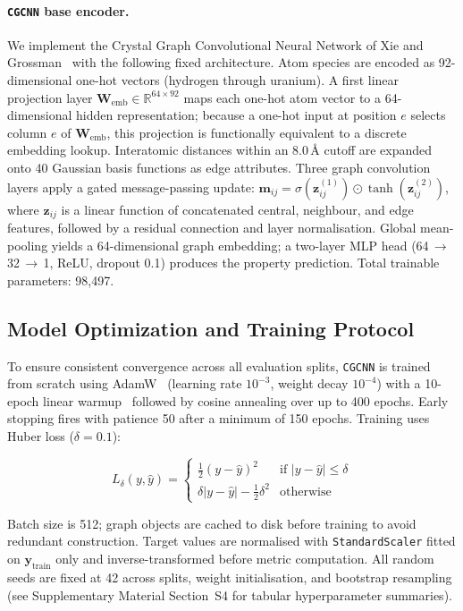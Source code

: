 \documentclass[final,5p,twocolumn,10pt]{elsarticle}
\newcommand{\cgcnn}{\texttt{CGCNN}}
\begin{document}
\paragraph{\cgcnn{} base encoder.}
We implement the Crystal Graph Convolutional Neural Network
of Xie and Grossman~\cite{xie2018crystal} with the following fixed
architecture. Atom species are encoded as 92-dimensional one-hot vectors
(hydrogen through uranium). A first linear projection layer
$\bm{W}_{\text{emb}} \in \mathbb{R}^{64 \times 92}$ maps each one-hot
atom vector to a 64-dimensional hidden representation; because a one-hot
input at position $e$ selects column $e$ of $\bm{W}_{\text{emb}}$, this
projection is functionally equivalent to a discrete embedding lookup.
Interatomic distances within an 8.0\,\AA{} cutoff are expanded onto 40
Gaussian basis functions as edge attributes. Three graph convolution
layers apply a gated message-passing update:
$\bm{m}_{ij} = \sigma(\bm{z}^{(1)}_{ij}) \odot \tanh(\bm{z}^{(2)}_{ij})$,
where $\bm{z}_{ij}$ is a linear function of concatenated central, neighbour,
and edge features, followed by a residual connection and layer normalisation.
Global mean-pooling yields a 64-dimensional graph embedding; a two-layer MLP
head (64$\,{\to}\,$32$\,{\to}\,$1, ReLU, dropout 0.1) produces the property
prediction. Total trainable parameters: 98,497.

\subsection{Model Optimization and Training Protocol}
\label{sec:training}

To ensure consistent convergence across all evaluation splits, \cgcnn{}
is trained from scratch using AdamW~\cite{loshchilov2019decoupled}
(learning rate $10^{-3}$, weight decay $10^{-4}$) with a 10-epoch
linear warmup~\cite{goyal2017accurate} followed by cosine annealing
over up to 400 epochs. Early stopping fires with patience 50 after a
minimum of 150 epochs. Training uses Huber loss ($\delta = 0.1$):

\begin{equation}
  L_\delta(y, \hat{y}) = \begin{cases}
    \tfrac{1}{2}(y - \hat{y})^2 & \text{if } |y - \hat{y}| \le \delta \\
    \delta |y - \hat{y}| - \tfrac{1}{2}\delta^2 & \text{otherwise}
  \end{cases}
\end{equation}

\noindent Batch size is 512; graph objects are cached to disk before
training to avoid redundant construction. Target values are normalised
with \texttt{StandardScaler} fitted on $\bm{y}_{\text{train}}$ only and
inverse-transformed before metric computation. All random seeds are fixed
at 42 across splits, weight initialisation, and bootstrap resampling (see
Supplementary Material Section~S4 for tabular hyperparameter summaries).
\end{document}
